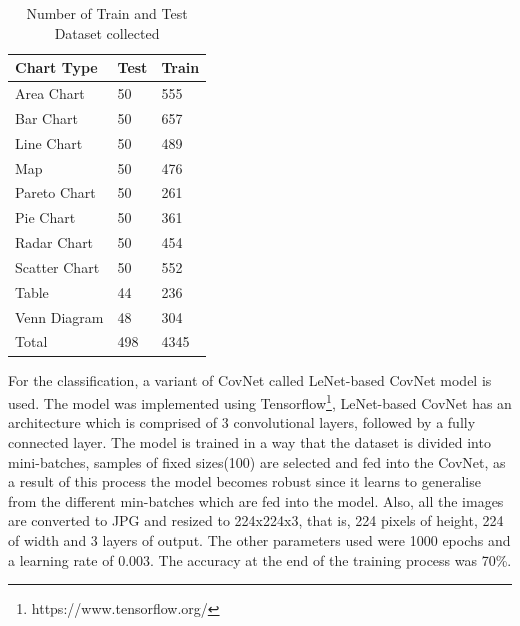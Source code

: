 \documentclass[12pt, a4paper,oneside]{report}
\begin{document}
\begin{table}[h]
	\centering {} \small
	\begin{tabular}{|p{5cm}|p{3cm}|p{3cm}|}
		
		\hline
		Chart Type & Test & Train \\ \hline
		Area Chart & 50 & 555 \\ \hline
		Bar Chart & 50 & 657 \\ \hline
		Line Chart & 50 & 489 \\ \hline
		Map & 50 & 476 \\ \hline
		Pareto Chart & 50 & 261 \\ \hline	
		Pie Chart & 50 & 361 \\ \hline
		Radar Chart & 50 & 454 \\ \hline
		Scatter Chart & 50 & 552 \\ \hline
		Table & 44 & 236 \\ \hline
		Venn Diagram & 48 & 304 \\ \hline
		Total & 498 & 4345 \\ \hline
		
	\end{tabular}
	\caption {Number of Train and Test Dataset collected}	
	\label{table:rela}
	
\end{table}
For the classification, a variant of CovNet called LeNet-based CovNet model is used. The model was implemented using Tensorflow\footnote{https://www.tensorflow.org/}, LeNet-based CovNet has an architecture which is comprised of 3 convolutional layers, followed by a fully connected layer. The model is trained in a way that the dataset is divided into mini-batches, samples of fixed sizes(100) are selected and fed into the CovNet, as a result of this process the model becomes robust since it learns to generalise from the different min-batches which are fed into the model. Also, all the images are converted to JPG and resized to 224x224x3, that is, 224 pixels of height, 224 of width and 3 layers of output. The other parameters used were 1000 epochs and a learning rate of 0.003. The accuracy at the end of the training process was 70\%.
\end{document}
